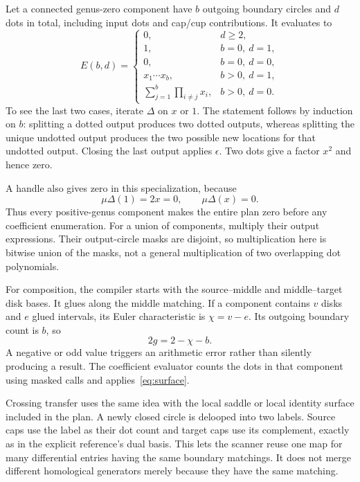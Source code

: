 \documentclass[11pt]{article}
\newcommand{\code}[1]{\texttt{\detokenize{#1}}}
\begin{document}
Let a connected genus-zero component have $b$ outgoing boundary circles and
$d$ dots in total, including input dots and cap/cup contributions. It evaluates
to
\begin{equation}\label{eq:surface}
 E(b,d)=
 \begin{cases}
 0,&d\geq2,\\
 1,&b=0,\ d=1,\\
 0,&b=0,\ d=0,\\
 x_1\cdots x_b,&b>0,\ d=1,\\
 \displaystyle\sum_{j=1}^{b}\prod_{i\ne j}x_i,&b>0,\ d=0.
 \end{cases}
\end{equation}
To see the last two cases, iterate $\Delta$ on $x$ or $1$. The statement follows
by induction on $b$: splitting a dotted output produces two dotted outputs,
whereas splitting the unique undotted output produces the two possible new
locations for that undotted output. Closing the last output applies $\epsilon$.
Two dots give a factor $x^2$ and hence zero.

A handle also gives zero in this specialization, because
\[
 \mu\Delta(1)=2x=0,\qquad \mu\Delta(x)=0.
\]
Thus every positive-genus component makes the entire plan zero before any
coefficient enumeration. For a union of components, multiply their output
expressions. Their output-circle masks are disjoint, so multiplication here is
bitwise union of the masks, not a general multiplication of two overlapping
dot polynomials.

For composition, the compiler starts with the source--middle and
middle--target disk bases. It glues along the middle matching. If a component
contains $v$ disks and $e$ glued intervals, its Euler characteristic is
$\chi=v-e$. Its outgoing boundary count is $b$, so
\[
 2g=2-\chi-b.
\]
A negative or odd value triggers an arithmetic error rather than silently
producing a result. The coefficient evaluator counts the dots in that component
using masked \code{bit_count()} calls and applies~\eqref{eq:surface}.

Crossing transfer uses the same idea with the local saddle or local identity
surface included in the plan. A newly closed circle is delooped into two
labels. Source caps use the label as their dot count and target caps use its
complement, exactly as in the explicit reference's dual basis. This lets the
scanner reuse one map for many differential entries having the same boundary
matchings. It does not merge different homological generators merely because
they have the same matching.
\end{document}
